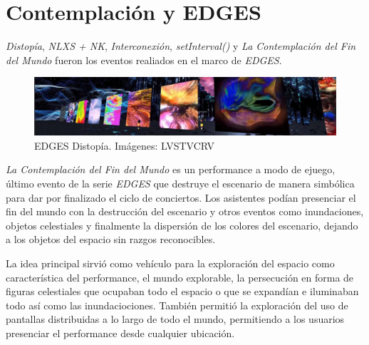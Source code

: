 
\section*{Contemplación y EDGES} %

\textit{Distopía}, \textit{NLXS + NK}, \textit{Interconexión}, \textit{setInterval()} y \textit{La Contemplación del Fin del Mundo} fueron los eventos realiados en el marco de \textit{EDGES}. 

\begin{figure}[H]
  \includegraphics[width=\textwidth]{img/distopia.png}
  \caption{EDGES Distopía. Imágenes: LVSTVCRV}
\end{figure}

\textit{La Contemplación del Fin del Mundo} es un performance a modo de ejuego, último evento de la serie \textit{EDGES} que destruye el escenario de manera simbólica para dar por finalizado el ciclo de conciertos. Los asistentes podían presenciar el fin del mundo con la destrucción del escenario y otros eventos como inundaciones, objetos celestiales y finalmente la dispersión de los colores del escenario, dejando a los objetos del espacio sin razgos reconocibles.

La idea principal sirvió como vehículo para la exploración del espacio como característica del performance, el mundo explorable, la persecución en forma de figuras celestiales que ocupaban todo el espacio o que se expandían e iluminaban todo así como las inundaciociones. También permitió la exploración del uso de pantallas distribuidas a lo largo de todo el mundo, permitiendo a los usuarios presenciar el performance desde cualquier ubicación.

